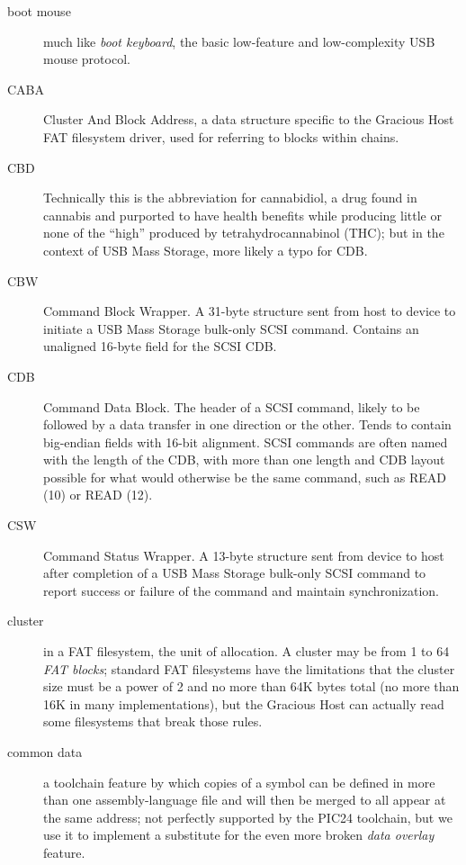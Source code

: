 \begin{description}
\item[boot mouse] much like \emph{boot keyboard}, the basic low-feature and
low-complexity USB mouse protocol.

\item[CABA] Cluster And Block Address, a data structure specific to the
Gracious Host FAT filesystem driver, used for referring to blocks within
chains.

\item[CBD] Technically this is the abbreviation for cannabidiol, a drug
found in cannabis and purported to have health benefits while producing
little or none of the ``high'' produced by tetrahydrocannabinol (THC); but
in the context of USB Mass Storage, more likely a typo for CDB.

\item[CBW] Command Block Wrapper.  A 31-byte structure sent from host to
device to initiate a USB Mass Storage bulk-only SCSI command.  Contains an
unaligned 16-byte field for the SCSI CDB.

\item[CDB] Command Data Block.  The header of a SCSI command, likely
to be followed by a data transfer in one direction or the other.  Tends to
contain big-endian fields with 16-bit alignment.  SCSI commands are often
named with the length of the CDB, with more than one length and CDB layout
possible for what would otherwise be the same command, such as READ (10) or
READ (12).

\item[CSW] Command Status Wrapper.  A 13-byte structure sent from device to
host after completion of a USB Mass Storage bulk-only SCSI command to report
success or failure of the command and maintain synchronization.

\item[cluster] in a FAT filesystem, the unit of allocation.  A cluster may
be from 1 to 64 \emph{FAT blocks}; standard FAT filesystems have the
limitations that the cluster size must be a power of 2 and no more than 64K
bytes total (no more than 16K in many implementations), but the Gracious
Host can actually read some filesystems that break those rules.

\item[common data] a toolchain feature by which copies of a symbol can be
defined in more than one assembly-language file and will then be merged to
all appear at the same address; not perfectly supported by the
PIC24 toolchain, but we use it to implement a substitute for the even more
broken \emph{data overlay} feature.


\end{description}

